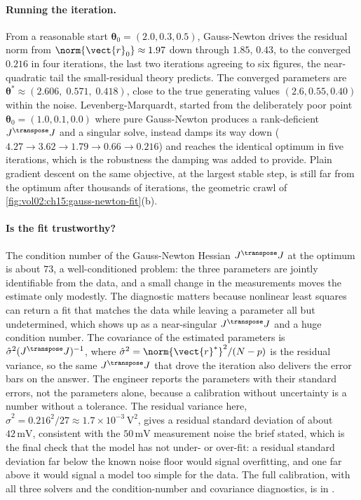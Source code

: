 \paragraph{Running the iteration.}
From a reasonable start $\boldsymbol{\theta}_{0} = (2.0, 0.3, 0.5)$,
Gauss-Newton drives the residual norm from $\norm{\vect{r}_{0}} \approx
1.97$ down through $1.85$, $0.43$, to the converged $0.216$ in four
iterations, the last two iterations agreeing to six figures, the
near-quadratic tail the small-residual theory predicts. The converged
parameters are $\boldsymbol{\theta}^{*} \approx (2.606, \; 0.571, \;
0.418)$, close to the true generating values $(2.6, 0.55, 0.40)$ within
the noise. Levenberg-Marquardt, started from the deliberately poor
point $\boldsymbol{\theta}_{0} = (1.0, 0.1, 0.0)$ where pure
Gauss-Newton produces a rank-deficient $J^{\transpose} J$ and a
singular solve, instead damps its way down ($4.27 \to 3.62 \to 1.79 \to
0.66 \to 0.216$) and reaches the identical optimum in five iterations,
which is the robustness the damping was added to provide. Plain
gradient descent on the same objective, at the largest stable step, is
still far from the optimum after thousands of iterations, the geometric
crawl of \cref{fig:vol02:ch15:gauss-newton-fit}(b).



\paragraph{Is the fit trustworthy?}
The condition number of the Gauss-Newton Hessian $J^{\transpose} J$ at
the optimum is about $73$, a well-conditioned problem: the three
parameters are jointly identifiable from the data, and a small change
in the measurements moves the estimate only modestly. The diagnostic
matters because nonlinear least squares can return a fit that matches
the data while leaving a parameter all but undetermined, which
shows up as a near-singular $J^{\transpose} J$ and a huge condition
number. The covariance of the estimated parameters is
$\hat{\sigma}^{2} (J^{\transpose} J)^{-1}$, where $\hat{\sigma}^{2} =
\norm{\vect{r}^{*}}^{2} / (N - p)$ is the residual variance, so the
same $J^{\transpose} J$ that drove the iteration also delivers the
error bars on the answer. The engineer reports the parameters with
their standard errors, not the parameters alone, because a calibration
without uncertainty is a number without a tolerance. The residual
variance here, $\hat{\sigma}^{2} = 0.216^{2} / 27 \approx 1.7 \times
10^{-3}\,\si{\volt\squared}$, gives a residual standard deviation of
about $42\,\si{\milli\volt}$, consistent with the
$50\,\si{\milli\volt}$ measurement noise the brief stated, which is the
final check that the model has not under- or over-fit: a residual
standard deviation far below the known noise floor would signal
overfitting, and one far above it would signal a model too simple for
the data. The full calibration, with all three solvers and the
condition-number and covariance diagnostics, is in
.

